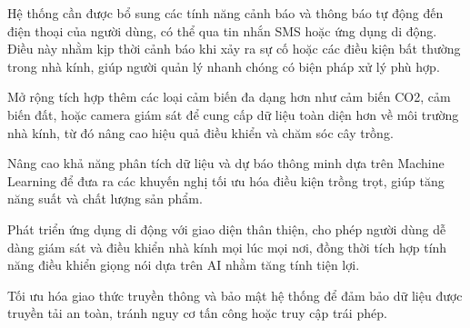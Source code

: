 Hệ thống cần được bổ sung các tính năng cảnh báo và thông báo tự động đến điện thoại của người dùng, có thể qua tin nhắn SMS hoặc ứng dụng di động. Điều này nhằm kịp thời cảnh báo khi xảy ra sự cố hoặc các điều kiện bất thường trong nhà kính, giúp người quản lý nhanh chóng có biện pháp xử lý phù hợp.

Mở rộng tích hợp thêm các loại cảm biến đa dạng hơn như cảm biến CO2, cảm biến đất, hoặc camera giám sát để cung cấp dữ liệu toàn diện hơn về môi trường nhà kính, từ đó nâng cao hiệu quả điều khiển và chăm sóc cây trồng.

Nâng cao khả năng phân tích dữ liệu và dự báo thông minh dựa trên Machine Learning để đưa ra các khuyến nghị tối ưu hóa điều kiện trồng trọt, giúp tăng năng suất và chất lượng sản phẩm.

Phát triển ứng dụng di động với giao diện thân thiện, cho phép người dùng dễ dàng giám sát và điều khiển nhà kính mọi lúc mọi nơi, đồng thời tích hợp tính năng điều khiển giọng nói dựa trên AI nhằm tăng tính tiện lợi.

Tối ưu hóa giao thức truyền thông và bảo mật hệ thống để đảm bảo dữ liệu được truyền tải an toàn, tránh nguy cơ tấn công hoặc truy cập trái phép.

\newpage
